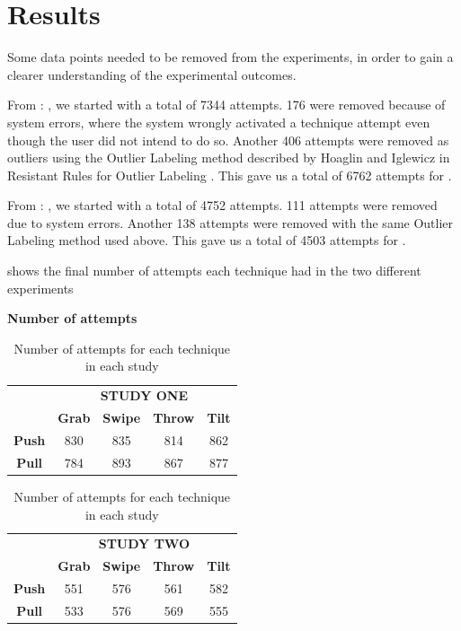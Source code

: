 \section{Results}\label{sec:results}
Some data points needed to be removed from the experiments, in order to gain a clearer understanding of the experimental outcomes. 

From \studyone: \target, we started with a total of 7344 attempts.
176 were removed because of system errors, where the system wrongly activated a technique attempt even though the user did not intend to do so.
Another 406 attempts were removed as outliers using the Outlier Labeling method described by Hoaglin and Iglewicz in Resistant Rules for Outlier Labeling \cite{Hoaglin:1987}.
This gave us a total of 6762 attempts for \studyone.

From \studytwo: \accuracy, we started with a total of 4752 attempts.
111 attempts were removed due to system errors. 
Another 138 attempts were removed with the same Outlier Labeling method used above.
This gave us a total of 4503 attempts for \studytwo.

 shows the final number of attempts each technique had in the two different experiments

\begin{table}[H]
	\centering
	\textbf{Number of attempts}\\[4pt]
	\begin{adjustbox}{width=\columnwidth}
		{
			\def\arraystretch{1.5}
			\begin{tabular}{c c c c c}
				& \multicolumn{4}{c}{\textbf{STUDY ONE}} \\
				\cline{2-5}
				& \textbf{Grab} & \textbf{Swipe} & \textbf{Throw} & \textbf{Tilt} \\ \hline
				\textbf{Push} & 830 & 835 & 814 & 862 \\ \hline
				\textbf{Pull} & 784 & 893 & 867 & 877 \\ \hline
			\end{tabular}
		}
		{
			\def\arraystretch{1.5}
			\begin{tabular}{c c c c c}
				& \multicolumn{4}{c}{\textbf{STUDY TWO}} \\
				\cline{2-5}
				& \textbf{Grab} & \textbf{Swipe} & \textbf{Throw} & \textbf{Tilt} \\ \hline
				\textbf{Push} & 551 & 576 & 561 & 582 \\ \hline
				\textbf{Pull} & 533 & 576 & 569 & 555 \\ \hline
			\end{tabular}
		}
	\end{adjustbox}
	\caption{Number of attempts for each technique in each study}
	\label{tab:numberOfAttempts}
\end{table}

